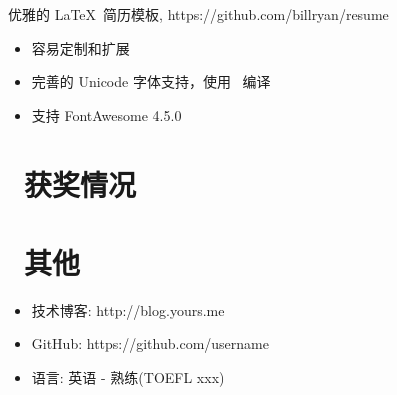 \documentclass{resume}
\begin{document}
\begin{onehalfspacing}
优雅的 \LaTeX\ 简历模板, https://github.com/billryan/resume
\begin{itemize}
  \item 容易定制和扩展
  \item 完善的 Unicode 字体支持，使用 \XeLaTeX\ 编译
  \item 支持 FontAwesome 4.5.0
\end{itemize}
\end{onehalfspacing}


\section{\faHeartO\ 获奖情况}

\section{\faInfo\ 其他}
\begin{itemize}[parsep=0.5ex]
  \item 技术博客: http://blog.yours.me
  \item GitHub: https://github.com/username
  \item 语言: 英语 - 熟练(TOEFL xxx)
\end{itemize}

%
%
\end{document}
